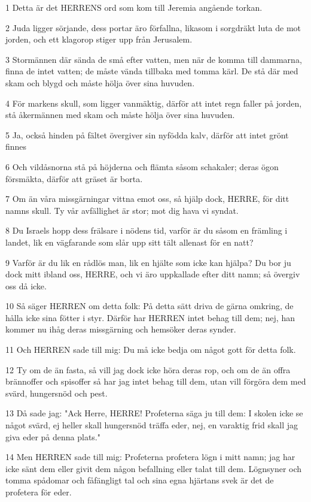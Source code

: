 \par 1 Detta är det HERRENS ord som kom till Jeremia angående torkan.
\par 2 Juda ligger sörjande, dess portar äro förfallna, likasom i sorgdräkt luta de mot jorden, och ett klagorop stiger upp från Jerusalem.
\par 3 Stormännen där sända de små efter vatten, men när de komma till dammarna, finna de intet vatten; de måste vända tillbaka med tomma kärl. De stå där med skam och blygd och måste hölja över sina huvuden.
\par 4 För markens skull, som ligger vanmäktig, därför att intet regn faller på jorden, stå åkermännen med skam och måste hölja över sina huvuden.
\par 5 Ja, också hinden på fältet övergiver sin nyfödda kalv, därför att intet grönt finnes
\par 6 Och vildåsnorna stå på höjderna och flämta såsom schakaler; deras ögon försmäkta, därför att gräset är borta.
\par 7 Om än våra missgärningar vittna emot oss, så hjälp dock, HERRE, för ditt namns skull. Ty vår avfällighet är stor; mot dig hava vi syndat.
\par 8 Du Israels hopp dess frälsare i nödens tid, varför är du såsom en främling i landet, lik en vägfarande som slår upp sitt tält allenast för en natt?
\par 9 Varför är du lik en rådlös man, lik en hjälte som icke kan hjälpa? Du bor ju dock mitt ibland oss, HERRE, och vi äro uppkallade efter ditt namn; så övergiv oss då icke.
\par 10 Så säger HERREN om detta folk: På detta sätt driva de gärna omkring, de hålla icke sina fötter i styr. Därför har HERREN intet behag till dem; nej, han kommer nu ihåg deras missgärning och hemsöker deras synder.
\par 11 Och HERREN sade till mig: Du må icke bedja om något gott för detta folk.
\par 12 Ty om de än fasta, så vill jag dock icke höra deras rop, och om de än offra brännoffer och spisoffer så har jag intet behag till dem, utan vill förgöra dem med svärd, hungersnöd och pest.
\par 13 Då sade jag: "Ack Herre, HERRE! Profeterna säga ju till dem: I skolen icke se något svärd, ej heller skall hungersnöd träffa eder, nej, en varaktig frid skall jag giva eder på denna plats."
\par 14 Men HERREN sade till mig: Profeterna profetera lögn i mitt namn; jag har icke sänt dem eller givit dem någon befallning eller talat till dem. Lögnsyner och tomma spådomar och fåfängligt tal och sina egna hjärtans svek är det de profetera för eder.
